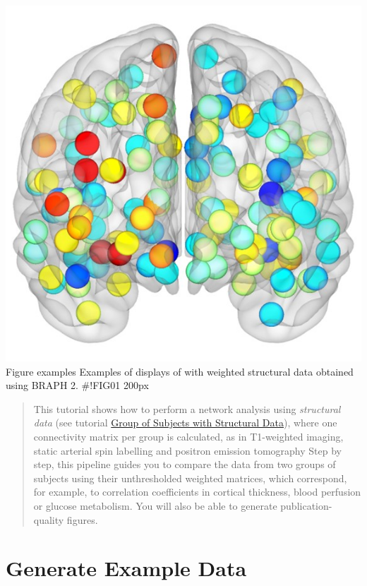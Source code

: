 \documentclass[justified]{tufte-handout}
\begin{document}
{	\includegraphics{fig_01_03.jpg}
	}
	{Figure examples}
	{
	Examples of displays of  with weighted structural data obtained using BRAPH 2.
	}
#!FIG01 200px
 
\begin{abstract}
\noindent
This tutorial shows how to perform a network analysis using \emph{structural data} (see tutorial \href{https://github.com/braph-software/BRAPH-2/tree/develop/tutorials/general/tut_gr_st}{Group of Subjects with Structural Data}), where one connectivity matrix per group is calculated, as in T1-weighted imaging, static arterial spin labelling and positron emission tomography Step by step, this pipeline guides you to compare the data from two groups of subjects using their unthresholded weighted matrices, which correspond, for example, to correlation coefficients in cortical thickness, blood perfusion or glucose metabolism. You will also be able to generate publication-quality figures.
\end{abstract}
\tableofcontents


\clearpage

\section{Generate Example Data}
\end{document}
